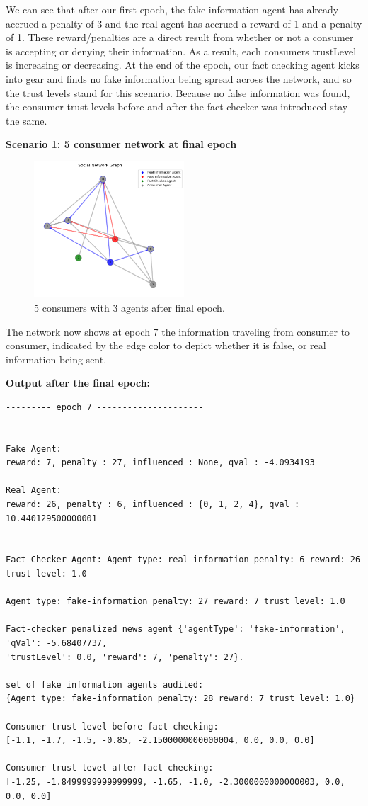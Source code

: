 \documentclass[twoside]{article}
\begin{document}
We can see that after our first epoch, the fake-information agent has already accrued a penalty of 3 and the real agent has accrued a reward of 1 and a penalty of 1. These reward/penalties are a direct result from whether or not a consumer is accepting or denying their information. As a result, each consumers trustLevel is increasing or decreasing. At the end of the epoch, our fact checking agent kicks into gear and finds no fake information being spread across the network, and so the trust levels stand for this scenario. Because no false information was found, the consumer trust levels before and after the fact checker was introduced stay the same.

\textbf{Scenario 1: 5 consumer network at final epoch}

\begin{figure}[htbp]
     \centering
     \includegraphics[width=0.5\textwidth]{../results/images/output1.png}
     \caption{5 consumers with 3 agents after final epoch.}
     \label{fig: 5 consumer, 3 agents}
 \end{figure}
 
The network now shows at epoch 7 the information traveling from consumer to consumer, indicated by the edge color to depict whether it is false, or real information being sent.

\textbf{Output after the final epoch:}
\begin{verbatim}
--------- epoch 7 ---------------------


Fake Agent: 
reward: 7, penalty : 27, influenced : None, qval : -4.0934193

Real Agent: 
reward: 26, penalty : 6, influenced : {0, 1, 2, 4}, qval : 10.440129500000001


Fact Checker Agent: Agent type: real-information penalty: 6 reward: 26 trust level: 1.0

Agent type: fake-information penalty: 27 reward: 7 trust level: 1.0

Fact-checker penalized news agent {'agentType': 'fake-information', 'qVal': -5.68407737, 
'trustLevel': 0.0, 'reward': 7, 'penalty': 27}.

set of fake information agents audited:  
{Agent type: fake-information penalty: 28 reward: 7 trust level: 1.0}

Consumer trust level before fact checking:  
[-1.1, -1.7, -1.5, -0.85, -2.1500000000000004, 0.0, 0.0, 0.0]

Consumer trust level after fact checking: 
[-1.25, -1.8499999999999999, -1.65, -1.0, -2.3000000000000003, 0.0, 0.0, 0.0]
\end{verbatim}
\end{document}

